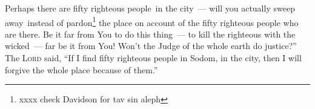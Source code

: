 \begin{inparaenum}
     Perhaps there are fifty righteous people\understood\ in the city~--- will you actually sweep away\understood\ instead of pardon\footnote{xxxx check Davidson for tav sin aleph} the place on account of the fifty righteous people who are there.%
     Be it far from You to do this thing~--- to kill the righteous with the wicked~--- far be it from You! Won't the Judge of the whole earth do justice?''%
     The \textsc{Lord} said, ``If I find fifty righteous people in Sodom, in the city, then I will forgive the whole place because of them.''%
\end{inparaenum}
